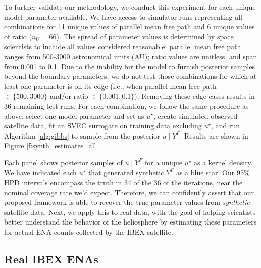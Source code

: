 \documentclass[11pt]{article}
\begin{document}
To further validate our methodology, we conduct this experiment for each
unique model parameter available. We have access to simulator runs
representing all combinations for 11 unique values of parallel mean free path
and 6 unique values of ratio {\color{red}($n_U=66$)}. The spread of parameter
values is determined by space scientists to include all values considered
reasonable: parallel mean free path ranges from 500-3000 astronomical units
(AU); ratio values are unitless, and span from 0.001 to 0.1. Due to the
inability for the model to furnish posterior samples beyond the boundary
parameters, we do not test those combinations for which at least one parameter
is on its edge (i.e., when parallel mean free path $\in \{500, 3000\}$ and/or
ratio $\in \{0.001, 0.1\}$). Removing these edge cases results in 36 remaining
test runs. For each combination, we follow the same procedure as above: select
one model parameter and set as $u^\star$, create simulated observed satellite
data, fit {\color{red}an SVEC} surrogate on training data excluding $u^\star$,
and run Algorithm \ref{alg:gibbs} to sample from the posterior $u \mid Y^F$.
Results are shown in Figure \ref{f:synth_estimates_all}.

Each panel shows posterior samples of $u \mid Y^F$ for a unique $u^\star$ as a
kernel density. We have indicated each $u^\star$ that generated synthetic $Y^F$
as a blue star. Our 95\% HPD intervals encompass the truth in 34 of the 36 of
the iterations, near the nominal coverage rate we'd expect. Therefore, we can
confidently assert that our proposed framework is able to recover the true
parameter values from \textit{synthetic} satellite data. Next, we apply this to
real data, with the goal of helping scientists better understand the behavior of
the heliosphere by estimating these parameters for actual ENA counts collected
by the IBEX satellite.

\subsection{Real IBEX ENAs}
\label{sec:ibex_exp}
\end{document}
